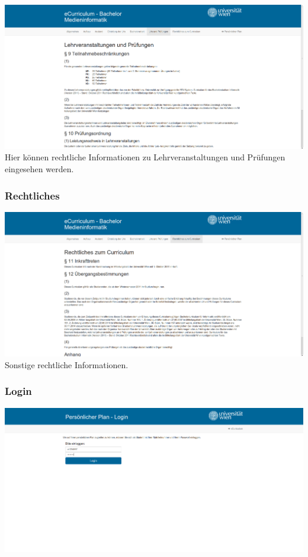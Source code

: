 \documentclass[a4paper,10pt]{scrartcl}
\begin{document}
\includegraphics[scale=0.19]{./hifi_screenshots/hifi_lv.png}\\

Hier können rechtliche Informationen zu Lehrveranstaltungen und Prüfungen eingesehen werden.

\subsubsection*{Rechtliches}

\includegraphics[scale=0.19]{./hifi_screenshots/hifi_recht.png}\\

Sonstige rechtliche Informationen.

\subsubsection*{Login}

\includegraphics[scale=0.19]{./hifi_screenshots/hifi_login.png}\\
\end{document}
